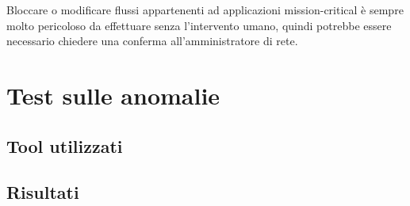 Bloccare o modificare flussi appartenenti ad applicazioni mission-critical è sempre molto pericoloso da effettuare senza l'intervento umano, quindi potrebbe essere necessario chiedere una conferma all'amministratore di rete.



\section{Test sulle anomalie}
\subsection{Tool utilizzati}
\subsection{Risultati}
